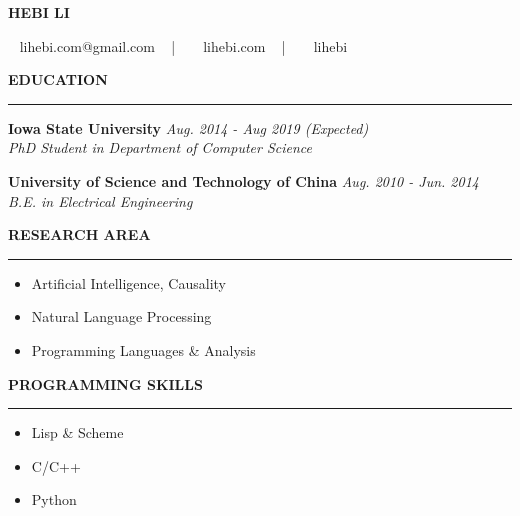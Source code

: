 \documentclass[10pt,letterpaper]{article}
\newenvironment{mysection}[1]{ %
  \medskip
  \MakeUppercase{\bf #1}
  \medskip
  \hrule
  \medskip
  \begin{list}{}{
      \setlength{\leftmargin}{1.5em}
    }
  \item[]
}{
  \end{list}
}
\begin{document}
\centerline{\MakeUppercase{\huge\bf Hebi Li}}
\medskip
\centerline{\faEnvelope ~ lihebi.com@gmail.com ~ | ~
  \faHome ~ lihebi.com ~ | ~ \faGithubSquare ~ lihebi
}

\begin{mysection}{Education}
  \textbf{Iowa State University} \hfill \emph{Aug. 2014 - Aug 2019 (Expected)} \\
  \emph{PhD Student in Department of Computer Science}

  \textbf{University of Science and Technology of China}
  \hfill \emph{Aug. 2010 - Jun. 2014} \\
  \emph{B.E. in Electrical Engineering}
\end{mysection}


\begin{minipage}{0.5\textwidth}
  \begin{mysection}{Research Area}
    \begin{itemize}
    \item Artificial Intelligence, Causality
    \item Natural Language Processing
    \item Programming Languages \& Analysis
    \end{itemize}
  \end{mysection}
\end{minipage}
\begin{minipage}{0.5\textwidth}
  \begin{mysection}{Programming Skills}
    \begin{itemize}
    \item Lisp \& Scheme
    \item C/C++
    \item Python
    \end{itemize}
  \end{mysection}
\end{minipage}
  
\end{document}
